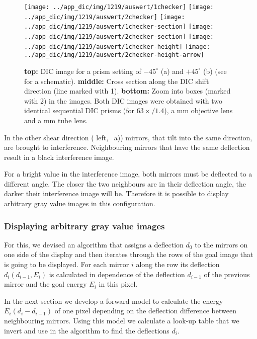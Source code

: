 \begin{figure}[!htbp]
  \centering
  \texttt{[image: ../app\_dic/img/1219/auswert/1checker]}
  \texttt{[image: ../app\_dic/img/1219/auswert/2checker]}
  \texttt{[image: ../app\_dic/img/1219/auswert/1checker-section]}
  \texttt{[image: ../app\_dic/img/1219/auswert/2checker-section]}
  \texttt{[image: ../app\_dic/img/1219/auswert/1checker-height]}
  \texttt{[image: ../app\_dic/img/1219/auswert/2checker-height-arrow]}
  \caption{{\bf top:} DIC image for a prism setting of $-45^\circ$ (a)
    and $+45^\circ$ (b) (see  for a
    schematic). {\bf middle:} Cross section along the DIC shift
    direction (line marked with 1). {\bf bottom:} Zoom into boxes
    (marked with 2) in the images.  Both DIC images were obtained 
    with two identical sequential DIC prisms (for $63\times/1.4$), a
    \unit[100]{mm} objective lens and a \unit[300]{mm} tube lens.}
  \label{fig:screen5}
\end{figure}

In the other shear direction ( left,
~a)) mirrors, that tilt into the same direction,
are brought to interference. Neighbouring mirrors that have the same
deflection result in a black interference image. 

For a bright value in the interference image, both mirrors must be
deflected to a different angle. The closer the two neighbours are in
their deflection angle, the darker their interference image will be.
Therefore it is possible to display arbitrary gray value images in
this configuration.

\subsubsection*{Displaying arbitrary gray value images}

For this, we devised an algorithm that assigns a deflection $d_0$ to
the mirrors on one side of the display and then iterates through the
rows of the goal image that is going to be displayed. For each mirror
$i$ along the row its deflection $d_i(d_{i-1},E_i)$ is calculated in
dependence of the deflection $d_{i-1}$ of the previous mirror and the
goal energy $E_i$ in this pixel.

In the next section we develop a forward model to calculate the energy
$E_i(d_i-d_{i-1})$ of one pixel depending on the deflection difference
between neighbouring mirrors. Using this model we calculate a look-up
table that we invert and use in the algorithm to find the deflections
$d_i$.


